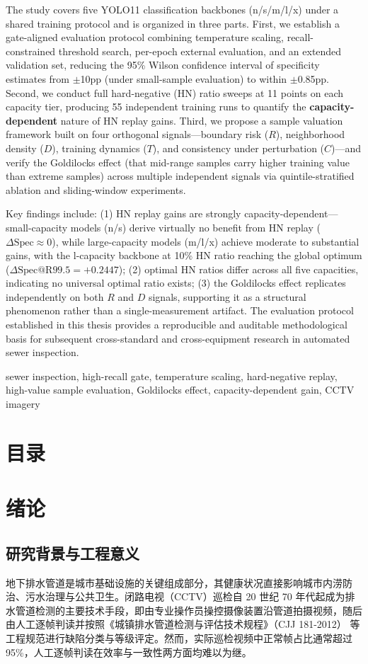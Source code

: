 \documentclass[UTF8,openany,12pt]{ctexbook}
\makeatletter
\renewcommand{\contentsname}{目\quad 录}
\newcommand{\engkeywords}[1]{\par\noindent{\bfseries Key words:}#1}
\newcommand{\compactfrontlist}[4]{%
    \chapter*{#1}%
    \pdfbookmark[0]{#2}{#3}%
    {\linespread{1.12}\selectfont\@starttoc{#4}\par}%
}
\makeatother
\begin{document}
The study covers five YOLO11 classification backbones (n/s/m/l/x) under a shared training protocol and is organized in three parts. First, we establish a gate-aligned evaluation protocol combining temperature scaling, recall-constrained threshold search, per-epoch external evaluation, and an extended validation set, reducing the 95\% Wilson confidence interval of specificity estimates from $\pm$10pp (under small-sample evaluation) to within $\pm$0.85pp. Second, we conduct full hard-negative (HN) ratio sweeps at 11 points on each capacity tier, producing 55 independent training runs to quantify the \textbf{capacity-dependent} nature of HN replay gains. Third, we propose a sample valuation framework built on four orthogonal signals---boundary risk ($R$), neighborhood density ($D$), training dynamics ($T$), and consistency under perturbation ($C$)---and verify the Goldilocks effect (that mid-range samples carry higher training value than extreme samples) across multiple independent signals via quintile-stratified ablation and sliding-window experiments.

Key findings include: (1) HN replay gains are strongly capacity-dependent---small-capacity models (n/s) derive virtually no benefit from HN replay ($\Delta\mathrm{Spec} \approx 0$), while large-capacity models (m/l/x) achieve moderate to substantial gains, with the l-capacity backbone at 10\% HN ratio reaching the global optimum ($\Delta\mathrm{Spec@R99.5} = +0.2447$); (2) optimal HN ratios differ across all five capacities, indicating no universal optimal ratio exists; (3) the Goldilocks effect replicates independently on both $R$ and $D$ signals, supporting it as a structural phenomenon rather than a single-measurement artifact. The evaluation protocol established in this thesis provides a reproducible and auditable methodological basis for subsequent cross-standard and cross-equipment research in automated sewer inspection.
\engkeywords{sewer inspection, high-recall gate, temperature scaling, hard-negative replay, high-value sample evaluation, Goldilocks effect, capacity-dependent gain, CCTV imagery}

\compactfrontlist{\contentsname}{目录}{toc}{toc}

\mainmatter

\chapter{绪论}

\section{研究背景与工程意义}
地下排水管道是城市基础设施的关键组成部分，其健康状况直接影响城市内涝防治、污水治理与公共卫生\cite{moradi2019review,haurum2020survey}。闭路电视（CCTV）巡检自 20 世纪 70 年代起成为排水管道检测的主要技术手段\cite{moradi2019review,haurum2020survey}，即由专业操作员操控摄像装置沿管道拍摄视频，随后由人工逐帧判读并按照《城镇排水管道检测与评估技术规程》（CJJ 181-2012）\cite{cjj181} 等工程规范进行缺陷分类与等级评定。然而，实际巡检视频中正常帧占比通常超过 95\%\cite{haurum2020survey}，人工逐帧判读在效率与一致性两方面均难以为继\cite{cheng2018deep,ma2026stateoftheart}。
\end{document}
